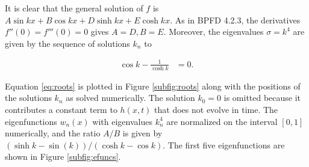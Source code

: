 It is clear that the general solution of $f$ is $A \sin kx + B \cos kx + D \sinh kx + E \cosh kx$. As in BPFD 4.2.3, the derivatives $f''(0) = f'''(0) = 0$ gives $A = D, B = E$. Moreover, the eigenvalues $\sigma = k^4$ are given by the sequence of solutions $k_n$ to 

\begin{align}
    \cos k - \frac{1}{\cosh k} &= 0. \label{eq:roots}
\end{align}

Equation \ref{eq:roots} is plotted in Figure \ref{subfig:roots} along with the positions of the solutions $k_n$ as solved numerically. The solution $k_0 = 0$ is omitted because it contributes a constant term to $h(x, t)$ that does not evolve in time. The eigenfunctions $w_n(x)$ with eigenvalues $k_n^4$ are normalized on the interval $[0,1]$ numerically, and the ratio $A/B$ is given by $(\sinh k - \sin(k)) / (\cosh k - \cos k)$. The first five eigenfunctions are shown in Figure \ref{subfig:efuncs}. 

